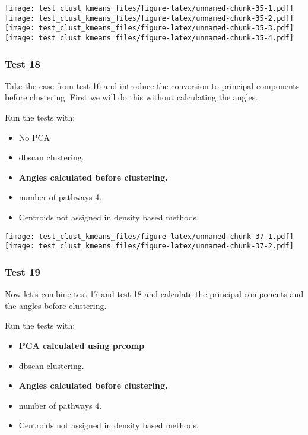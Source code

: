 \documentclass[
]{article}
\providecommand{\tightlist}{%
  \setlength{\itemsep}{0pt}\setlength{\parskip}{0pt}}
\begin{document}
\texttt{[image: test\_clust\_kmeans\_files/figure-latex/unnamed-chunk-35-1.pdf]}
\texttt{[image: test\_clust\_kmeans\_files/figure-latex/unnamed-chunk-35-2.pdf]}
\texttt{[image: test\_clust\_kmeans\_files/figure-latex/unnamed-chunk-35-3.pdf]}
\texttt{[image: test\_clust\_kmeans\_files/figure-latex/unnamed-chunk-35-4.pdf]}

\hypertarget{test18}{%
\subsubsection{Test 18}\label{test18}}

Take the case from \protect\hyperlink{test16}{test 16} and introduce the
conversion to principal components before clustering. First we will do
this without calculating the angles.

Run the tests with:

\begin{itemize}
\tightlist
\item
  No PCA
\item
  dbscan clustering.
\item
  \textbf{Angles calculated before clustering.}
\item
  number of pathways 4.
\item
  Centroids not assigned in density based methods.
\end{itemize}

\texttt{[image: test\_clust\_kmeans\_files/figure-latex/unnamed-chunk-37-1.pdf]}
\texttt{[image: test\_clust\_kmeans\_files/figure-latex/unnamed-chunk-37-2.pdf]}

\hypertarget{test19}{%
\subsubsection{Test 19}\label{test19}}

Now let's combine \protect\hyperlink{test17}{test 17} and
\protect\hyperlink{test18}{test 18} and calculate the principal
components and the angles before clustering.

Run the tests with:

\begin{itemize}
\tightlist
\item
  \textbf{PCA calculated using prcomp}
\item
  dbscan clustering.
\item
  \textbf{Angles calculated before clustering.}
\item
  number of pathways 4.
\item
  Centroids not assigned in density based methods.
\end{itemize}
\end{document}
